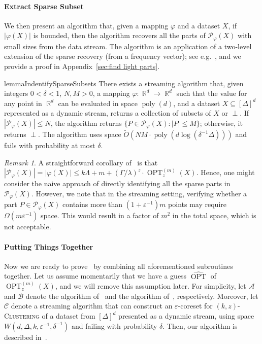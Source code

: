 \documentclass[letterpaper,11pt]{article}
\theoremstyle{plain}
\theoremstyle{definition}
\theoremstyle{remark}
\newtheorem{remark}[theorem]{Remark}
\DeclareMathOperator{\R}{\mathbb{R}}
\DeclareMathOperator{\poly}{poly}
\DeclareMathOperator{\OPT}{OPT}
\newcommand{\GOPT}{\widehat{\OPT}}
\newcommand{\eps}{\varepsilon}
\renewcommand{\phi}{\varphi}
\newcommand{\calA}{\mathcal{A}}
\newcommand{\calB}{\mathcal{B}}
\newcommand{\calC}{\mathcal{C}}
\newcommand{\calP}{\mathcal{P}}
\newcommand{\ProblemName}[1]{\textsc{#1}}
\newcommand{\kzC}{\ProblemName{$(k,z)$-Clustering}\xspace}
\begin{document}
\paragraph{Extract Sparse Subset}
We then present an algorithm that, given a mapping $\phi$ and a dataset $X$, if $|\phi(X)|$ is bounded, then the algorithm recovers all the parts of $\calP_{\phi}(X)$ with small sizes from the data stream. The algorithm is an application of a two-level extension of the sparse recovery (from a frequency vector); see e.g.~\cite{Cormode06Combinatorial}, and we provide a proof in Appendix~\ref{sec:find light parts}.
\begin{restatable}{lemma}{IndentifySparseSubsets}
    \label{lem:find light parts}
    There exists a streaming algorithm that, given integers $0<\delta<1$, $ N, M>0$, a mapping $\phi:\R^d\to\R^d$ such that the value for any point in $\R^d$ can be evaluated in space $\poly(d)$, and a dataset $X\subseteq [\Delta]^d$ represented as a dynamic stream, returns a collection of subsets of $X$ or $\perp$. 
If $|\calP_{\phi}(X)|\le  N$, the algorithm returns
    $\{P\in\calP_{\phi}(X): |P|\le  M\}$; otherwise, it returns $\perp$. The algorithm uses space $\tilde O\left( N M\cdot \poly(d\log(\delta^{-1}\Delta))\right)$ and fails with probability at most $\delta$.
\end{restatable}
\begin{remark}
    A straightforward corollary of~ is that $|\calP_\phi(X)| = |\phi(X)|\le k\Lambda + m + (\Gamma/\lambda)^z\cdot\OPT_z^{(m)}(X)$. Hence, one might consider the naive approach of directly identifying all the sparse parts in $\calP_{\phi}(X)$.
However, we note that in the streaming setting, verifying whether a part $P\in\calP_\phi(X)$ contains more than $(1+\eps^{-1})m$ points may require $\Omega(m\eps^{-1})$ space. This would result in a factor of $m^2$ in the total space, which is not acceptable. 
\end{remark}

\paragraph{Putting Things Together} 
Now we are ready to prove~ by combining all aforementioned subroutines together.
Let us assume momentarily that we have a guess $\GOPT$ of $\OPT_z^{(m)}(X)$, and we will remove this assumption later.
For simplicity, let $\calA$ and $\calB$ denote the algorithm of~ and the algorithm of~, respectively. Moreover, let $\calC$ denote a streaming algorithm that can construct an $\eps$-coreset for \kzC of a dataset from $[\Delta]^d$ presented as a dynamic stream, using space $W(d,\Delta,k,\eps^{-1},\delta^{-1})$ and failing with probability $\delta$.
Then, our algorithm is described in~.
\end{document}
